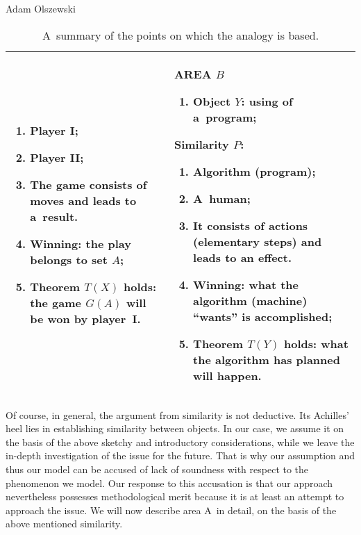 \begin{artengenv}{Adam Olszewski}
\begin{table}[H]
\begin{small}
\begin{tabular}{|p{}|p{}|}
\begin{enumerate}[wide, labelwidth=!, labelindent=0pt, start=2]
\item Player \textbf{I};
\item Player \textbf{II};
\item The game consists of moves and leads to a~result.
\item Winning: the play belongs to set $A$;
\item Theorem $T(X)$ holds: the game $G(A)$ will be won by player~\textbf{I}.
\end{enumerate}
&
AREA $B$

\begin{enumerate}[wide, labelwidth=!, labelindent=0pt]
\item Object $Y$: using of a~program;
\end{enumerate}
Similarity $P$:

\begin{enumerate}[wide, labelwidth=!, labelindent=0pt,start=2]
\item Algorithm (program);
\item A~human;
\item It consists of actions (elementary steps) and leads to an effect.
\item Winning: what the algorithm (machine) ``wants'' is accomplished;
\item Theorem $T(Y)$ holds: what the algorithm has planned will happen.
\end{enumerate}
\\\hline
\end{tabular}
\end{small}
\caption{A~summary of the points on which the analogy is based.}

\end{table}

Of course, in general, the argument from similarity is not deductive. Its Achilles' heel lies in establishing similarity between objects. In our case, we assume it on the basis of the above sketchy and introductory considerations, while we leave the in-depth investigation of the issue for the future. That is why our assumption and thus our model can be accused of lack of soundness with respect to the phenomenon we model. Our response to this accusation is that our approach nevertheless possesses methodological merit because it is at least an attempt to approach the issue. We will now describe area A~in detail, on the basis of the above mentioned similarity.


\end{artengenv}
